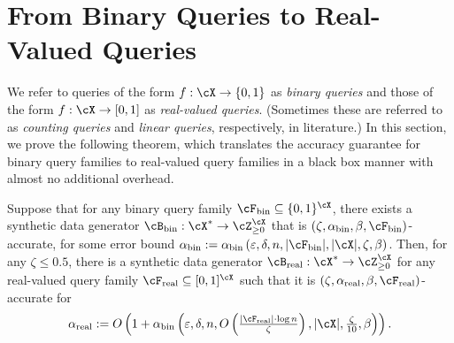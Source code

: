 \newcommand{\bin}{\mathrm{bin}}
\newcommand{\rval}{\mathrm{real}}
\newcommand{\bha}{\bh^{\ast}}

\section{From Binary Queries to Real-Valued Queries}

\label{app:real-v-bin}

We refer to queries of the form $f: \cX \to \{0, 1\}$ as \emph{binary queries} and those of the form $f: \cX \to [0, 1]$ as \emph{real-valued queries}. (Sometimes these are referred to as \emph{counting queries} and \emph{linear queries}, respectively, in literature.) In this section, we prove the following theorem, which translates the accuracy guarantee for binary query families to real-valued query families in a black box manner with almost no additional overhead.

\begin{theorem}\label{thm:bin-to-real}
Suppose that for any binary query family $\cF_{\bin} \subseteq \{0, 1\}^{\cX}$, there exists a synthetic data generator $\cB_{\bin} : \cX^* \to \cZ_{\ge 0}^{\cX}$ that is $(\zeta, \alpha_{\bin}, \beta, \cF_{\bin})$-accurate, for some error bound $\alpha_{\bin} := \alpha_{\bin}\prn{\eps, \delta, n, |\cF_{\bin}|, |\cX|, \zeta, \beta}$. Then, for any $\zeta \leq 0.5$, there is a synthetic data generator $\cB_{\rval} : \cX^* \to \cZ_{\ge 0}^{\cX}$ for any real-valued query family $\cF_{\rval} \subseteq [0, 1]^{\cX}$ such that it is $(\zeta, \alpha_{\rval}, \beta, \cF_{\rval})$-accurate for
\[\textstyle
\alpha_{\rval} := O\left(1 + \alpha_{\bin}\left(\eps, \delta, n, O\left(\frac{|\cF_{\rval}| \cdot \log n}{\zeta}\right), |\cX|, \frac\zeta{10}, \beta\right)\right).
\]
\end{theorem}

